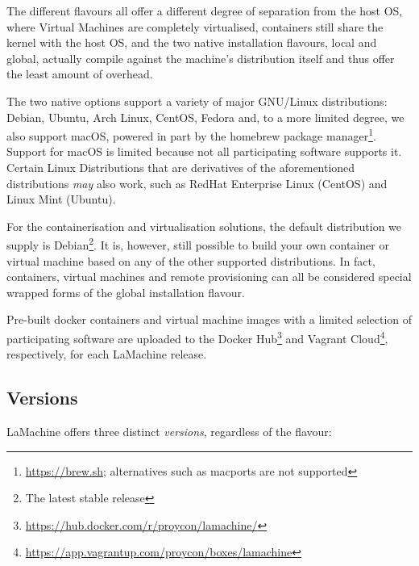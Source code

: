 \documentclass[a4paper,11pt]{article}
\begin{document}
The different flavours all offer a different degree of separation from the host OS, where Virtual Machines are
completely virtualised, containers still share the kernel with the host OS, and the two native installation flavours,
local and global, actually compile against the machine's distribution itself and thus offer the least amount of
overhead.

The two native options support a variety of major GNU/Linux distributions: Debian, Ubuntu, Arch Linux, CentOS, Fedora
and, to a more limited degree, we also support macOS, powered in part by the homebrew package
manager\footnote{\url{https://brew.sh}; alternatives such as macports are not supported}. Support for macOS is limited because not all participating
software supports it. Certain Linux Distributions that are derivatives of the aforementioned distributions \emph{may} also work, such as RedHat
Enterprise Linux (CentOS) and Linux Mint (Ubuntu).

For the containerisation and virtualisation solutions, the default distribution we supply is Debian\footnote{The latest
stable release}. It is, however, still possible to build your own container or virtual machine based on any of the other supported
distributions. In fact, containers, virtual machines and remote provisioning can all be considered special wrapped forms of
the global installation flavour.

Pre-built docker containers and virtual machine images with a limited selection of participating software are uploaded
to the Docker Hub\footnote{\url{https://hub.docker.com/r/proycon/lamachine/}} and Vagrant
Cloud\footnote{\url{https://app.vagrantup.com/proycon/boxes/lamachine}}, respectively, for each LaMachine release.

\subsection{Versions}

LaMachine offers three distinct \emph{versions}, regardless of the flavour:
\end{document}
